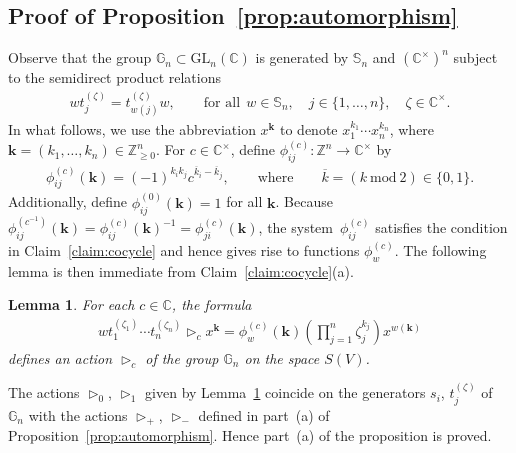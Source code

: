 \documentclass[pdftex]{sigma}
\newtheorem{Lemma}[Theorem]{Lemma}
\begin{document}
\subsection*{Proof of Proposition~\ref{prop:automorphism}}

Observe that the group $\mathbb G_n\subset \mathrm{GL}_n(\mathbb C)$ is generated by $\mathbb S_n$ and $(\mathbb
C^\times)^n$ subject to the semidirect product relations
\begin{gather*}
wt_j^{(\zeta)}=t_{w(j)}^{(\zeta)} w,
\qquad
\text{for all} \ \ w\in \mathbb S_n,
\quad
j\in\{1,\ldots,n\},
\quad
\zeta\in\mathbb C^\times.
\end{gather*}
In what follows, we use the abbreviation $x^{\mathbf k}$ to denote $x_1^{k_1}\cdots x_n^{k_n}$, where $\mathbf
k=(k_1,\ldots,k_n)\in \mathbb Z_{\ge 0}^n$.
For $c\in \mathbb C^\times$, def\/ine $\phi_{ij}^{(c)}\colon \mathbb Z^n\to \mathbb C^\times$ by
\begin{gather*}
\phi_{ij}^{(c)}(\mathbf k) = (-1)^{k_ik_j} c^{\overline k_i-\overline k_j},
\qquad
\text{where}
\qquad
\overline k=(k\ \mathrm{mod}\ 2)\in\{0,1\}.
\end{gather*}
Additionally, def\/ine $\phi_{ij}^{(0)}(\mathbf k)=1$ for all $\mathbf k$.
Because $\phi_{ij}^{(c^{-1})}(\mathbf k)=\phi_{ij}^{(c)}(\mathbf k)^{-1}=\phi_{ji}^{(c)}(\mathbf k)$, the system~$\phi_{ij}^{(c)}$ satisf\/ies the condition in Claim~\ref{claim:cocycle} and hence gives rise to functions
$\phi_w^{(c)}$.
The following lemma is then immediate from Claim~\ref{claim:cocycle}(a).

\begin{Lemma}
\label{lem:action}
For each $c\in\mathbb C$, the formula
\begin{gather*}
w t_1^{(\zeta_1)}\cdots t_n^{(\zeta_n)} \mathop{\triangleright}\nolimits_c x^{\mathbf k} = \phi^{(c)}_w(\mathbf k)
\left(\prod\limits_{j=1}^n \zeta_j^{k_j}\right) x^{w(\mathbf k)}
\end{gather*}
defines an action $\mathop{\triangleright}\nolimits_c$ of the group $\mathbb G_n$ on the space $S(V)$.
\end{Lemma}

The actions $\mathop{\triangleright}\nolimits_0$, $\mathop{\triangleright}\nolimits_1$ given by Lemma~\ref{lem:action}
coincide on the generators $s_i$, $t_j^{(\zeta)}$ of $\mathbb G_n$ with the actions
$\mathop{\triangleright}\nolimits_+$, $\mathop{\triangleright}\nolimits_-$ def\/ined in part~(a) of
Proposition~\ref{prop:automorphism}.
Hence part~(a) of the proposition is proved.
\end{document}
